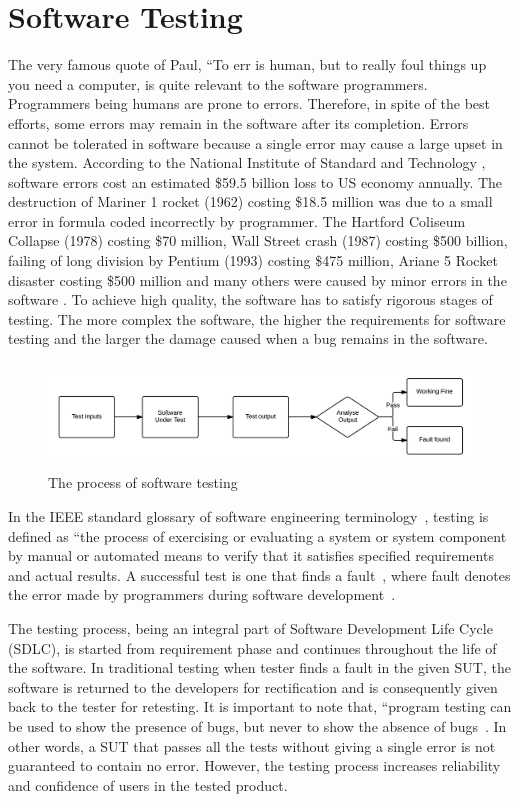 \chapter{Software Testing}
\label{chap:softwareTesting}
The very famous quote of Paul, ``To err is human, but to really foul things up you need a computer, is quite relevant to the software programmers. Programmers being humans are prone to errors. Therefore, in spite of the best efforts, some errors may remain in the software after its completion.  Errors cannot be tolerated in software because a single error may cause a large upset in the system. According to the National Institute of Standard and Technology \cite{Tassey2002}, software errors cost an estimated \$59.5 billion loss to US economy annually. The destruction of Mariner 1 rocket (1962) costing \$18.5 million was due to a small error in formula coded incorrectly by programmer. The Hartford Coliseum Collapse (1978) costing \$70 million, Wall Street crash (1987) costing \$500 billion, failing of long division by Pentium (1993) costing \$475 million, Ariane 5 Rocket disaster costing \$500 million and many others were caused by minor errors in the software \cite{toweysoftware}. To achieve high quality, the software has to satisfy rigorous stages of testing. The more complex the software, the higher the requirements for software testing and the larger the damage caused when a bug remains in the software.

\begin{figure}[h]
	\centering
	\includegraphics[width=13cm, height=2.8cm]{chapter2/softwareTesting.png}
	\caption{The process of software testing}
	\label{fig:softwareTesting}
\end{figure}

In the IEEE standard glossary of software engineering terminology~\cite{american1984}, testing is defined as ``the process of exercising or evaluating a system or system component by manual or automated means to verify that it satisfies specified requirements and actual results. A successful test is one that finds a fault~\cite{Myers1979}, where fault denotes the error made by programmers during software development~\cite{american1984}.

The testing process, being an integral part of Software Development Life Cycle (SDLC), is started from requirement phase and continues throughout the life of the software. In traditional testing when tester finds a fault in the given SUT, the software is returned to the developers for rectification and is consequently given back to the tester for retesting. It is important to note that, ``program testing can be used to show the presence of bugs, but never to show the absence of bugs~\cite{Dijkstra1972}. In other words, a SUT that passes all the tests without giving a single error is not guaranteed to contain no error. However, the testing process increases reliability and confidence of users in the tested product. 


